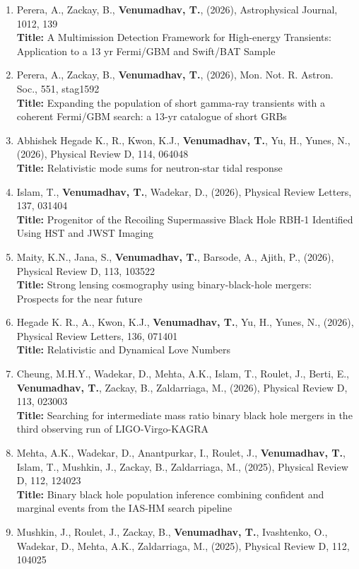 \documentclass{article}
\newcommand{\apj}{Astrophysical Journal}
\newcommand{\mnras}{Mon. Not. R. Astron. Soc.}
\newcommand{\prd}{Physical Review D}
\newcommand{\prl}{Physical Review Letters}
\begin{document}
{\addtolength{\leftskip}{10mm}
\begin{enumerate}[leftmargin=*,itemsep=0.45em,topsep=0.35em]
\item Perera, A., Zackay, B., \textbf{Venumadhav, T.}, (2026), \apj, 1012, 139 \\
\textbf{Title:} A Multimission Detection Framework for High-energy Transients: Application to a 13 yr Fermi/GBM and Swift/BAT Sample
\item Perera, A., Zackay, B., \textbf{Venumadhav, T.}, (2026), \mnras, 551, stag1592 \\
\textbf{Title:} Expanding the population of short gamma-ray transients with a coherent Fermi/GBM search: a 13-yr catalogue of short GRBs
\item Abhishek Hegade K., R., Kwon, K.J., \textbf{Venumadhav, T.}, Yu, H., Yunes, N., (2026), \prd, 114, 064048 \\
\textbf{Title:} Relativistic mode sums for neutron-star tidal response
\item Islam, T., \textbf{Venumadhav, T.}, Wadekar, D., (2026), \prl, 137, 031404 \\
\textbf{Title:} Progenitor of the Recoiling Supermassive Black Hole RBH-1 Identified Using HST and JWST Imaging
\item Maity, K.N., Jana, S., \textbf{Venumadhav, T.}, Barsode, A., Ajith, P., (2026), \prd, 113, 103522 \\
\textbf{Title:} Strong lensing cosmography using binary-black-hole mergers: Prospects for the near future
\item Hegade K. R., A., Kwon, K.J., \textbf{Venumadhav, T.}, Yu, H., Yunes, N., (2026), \prl, 136, 071401 \\
\textbf{Title:} Relativistic and Dynamical Love Numbers
\item Cheung, M.H.Y., Wadekar, D., Mehta, A.K., Islam, T., Roulet, J., Berti, E., \textbf{Venumadhav, T.}, Zackay, B., Zaldarriaga, M., (2026), \prd, 113, 023003 \\
\textbf{Title:} Searching for intermediate mass ratio binary black hole mergers in the third observing run of LIGO-Virgo-KAGRA
\item Mehta, A.K., Wadekar, D., Anantpurkar, I., Roulet, J., \textbf{Venumadhav, T.}, Islam, T., Mushkin, J., Zackay, B., Zaldarriaga, M., (2025), \prd, 112, 124023 \\
\textbf{Title:} Binary black hole population inference combining confident and marginal events from the IAS-HM search pipeline
\item Mushkin, J., Roulet, J., Zackay, B., \textbf{Venumadhav, T.}, Ivashtenko, O., Wadekar, D., Mehta, A.K., Zaldarriaga, M., (2025), \prd, 112, 104025 \\

\end{enumerate}}
\end{document}
